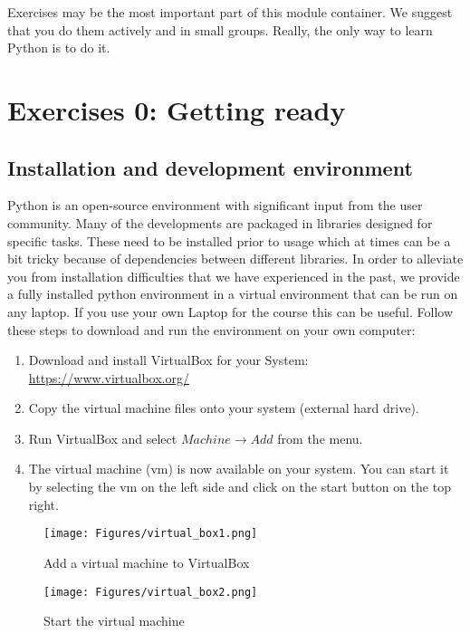 \begin{tcolorbox}[enhanced jigsaw,breakable,pad at break*=1mm,
    colback=blue!5!white,colframe=babyblueeyes,title=Exercises]
    Exercises may be the most important part of this module container.
    We suggest that you do them actively and in small groups. Really, the only way to learn Python is to do it.      
\end{tcolorbox}
\section{Exercises 0: Getting ready}

\subsection{Installation and development environment}
Python is an open-source environment with significant input from the user community.
Many of the developments are packaged in libraries designed for specific tasks.
These need to be installed prior to usage which at times can be a bit tricky because of dependencies between
different libraries. In order to alleviate you from installation difficulties that we have experienced in
the past, we provide a fully installed python environment in a virtual environment that can be run on any laptop.
If you use your own Laptop for the course this can be useful. Follow these steps to download and run the environment on your own computer:\\

\begin{enumerate}
    \item Download and install VirtualBox for your System: \url{https://www.virtualbox.org/}
    \item Copy the virtual machine files onto your system (external hard drive).
    \item Run VirtualBox and select $Machine \rightarrow Add$ from the menu.
    \item The virtual machine (vm) is now available on your system. You can start it by selecting the vm on the left side and click on the start button on the top right.
\end{enumerate}

\begin{figure}[h!]
    \centering
    \texttt{[image: Figures/virtual\_box1.png]}
    \caption{Add a virtual machine to VirtualBox}
\end{figure}

\begin{figure}[h!]
    \centering
    \texttt{[image: Figures/virtual\_box2.png]}
    \caption{Start the virtual machine}
\end{figure}

